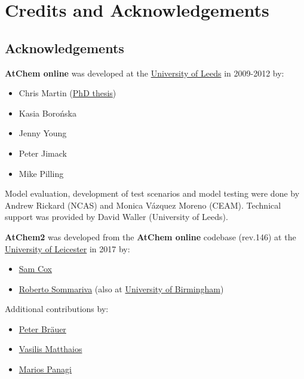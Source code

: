 \chapter{Credits and Acknowledgements} \label{ch:credits}

\section{Acknowledgements} \label{sec:acknowledgements}

\textbf{AtChem online} was developed at the
\href{https://www.leeds.ac.uk}{University of Leeds} in 2009-2012 by:

\begin{itemize}
\item Chris Martin (\href{http://etheses.whiterose.ac.uk/1596/}{PhD thesis})
\item Kasia Boro{\'n}ska
\item Jenny Young
\item Peter Jimack
\item Mike Pilling
\end{itemize}

Model evaluation, development of test scenarios and model testing were
done by Andrew Rickard (NCAS) and Monica V{\'a}zquez Moreno (CEAM).
Technical support was provided by David Waller (University of Leeds).


\textbf{AtChem2} was developed from the \textbf{AtChem online} codebase
(rev.146) at the \href{https://le.ac.uk}{University of Leicester} in
2017 by:

\begin{itemize}
\item \href{https://github.com/spco}{Sam Cox}
\item \href{https://github.com/rs028}{Roberto Sommariva} (also at
  \href{https://www.birmingham.ac.uk}{University of Birmingham})
\end{itemize}

Additional contributions by:

\begin{itemize}
\item \href{https://github.com/pb866}{Peter Br{\"a}uer}
\item \href{https://github.com/kailas29}{Vasilis Matthaios}
\item \href{https://github.com/mpanagi}{Marios Panagi}
\end{itemize}

